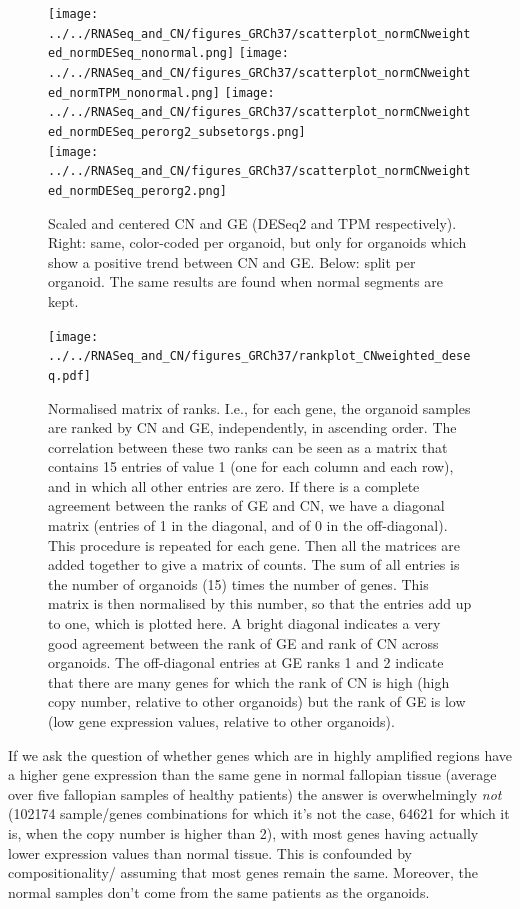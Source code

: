 \documentclass{article}
\begin{document}
\begin{figure}[h]
\centering
\texttt{[image: ../../RNASeq\_and\_CN/figures\_GRCh37/scatterplot\_normCNweighted\_normDESeq\_nonormal.png]}
\texttt{[image: ../../RNASeq\_and\_CN/figures\_GRCh37/scatterplot\_normCNweighted\_normTPM\_nonormal.png]}
\texttt{[image: ../../RNASeq\_and\_CN/figures\_GRCh37/scatterplot\_normCNweighted\_normDESeq\_perorg2\_subsetorgs.png]}\\
\texttt{[image: ../../RNASeq\_and\_CN/figures\_GRCh37/scatterplot\_normCNweighted\_normDESeq\_perorg2.png]}
\caption{Scaled and centered CN and GE (DESeq2 and TPM respectively). Right: same, color-coded per organoid, but only for organoids which show a positive trend between CN and GE. Below: split per organoid. The same results are found when normal segments are kept. \label{fig:scaled_CN_GE}} %
\end{figure}


\begin{figure}[h]
\centering
\texttt{[image: ../../RNASeq\_and\_CN/figures\_GRCh37/rankplot\_CNweighted\_deseq.pdf]}
\caption{Normalised matrix of ranks. I.e., for each gene, the organoid samples are ranked by CN and GE,  independently,  in ascending order. The correlation between these two ranks can be seen as a matrix that contains 15 entries of value 1 (one for each column and each row), and in which all other entries are zero. If there is a complete agreement between the ranks of GE and CN, we have a diagonal matrix (entries of 1 in the diagonal, and of 0 in the off-diagonal). This procedure is repeated for each gene. Then all the matrices are added together to give a matrix of counts. The sum of all entries is the number of organoids (15) times the number of genes. This matrix is then normalised by this number, so that the entries add up to one, which is plotted here. A bright diagonal indicates a very good agreement between the rank of GE and rank of CN across organoids.\label{fig:rank_CN_GE} The off-diagonal entries at GE ranks 1 and 2 indicate that there are many genes for which the rank of CN is high (high copy number, relative to other organoids) but the rank of GE is low (low gene expression values, relative to other organoids).}
\end{figure}

\medskip

If we ask the question of whether genes which are in highly amplified regions have a higher gene expression than the same gene in normal fallopian tissue (average over five fallopian samples of healthy patients) the answer is overwhelmingly \emph{not} (102174 sample/genes combinations for which it's not the case,  64621 for which it is, when the copy number is higher than 2), with most genes having actually lower expression values than normal tissue. This is confounded by compositionality/ assuming that most genes remain the same. Moreover, the normal samples don't come from the same patients as the organoids.
\end{document}
